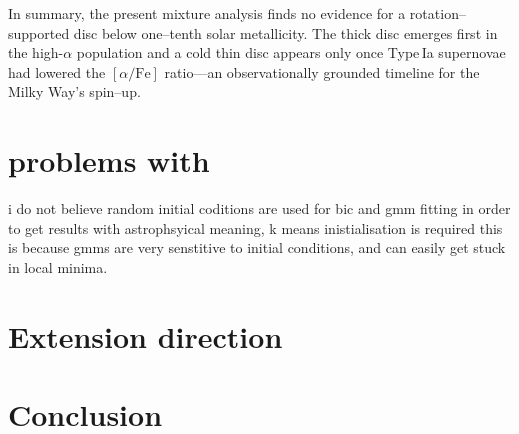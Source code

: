 \documentclass[a4paper,12pt]{article}
\begin{document}
\medskip
In summary, the present mixture analysis finds no evidence for a
rotation–supported disc below one–tenth solar metallicity.  The thick
disc emerges first in the high-$\alpha$ population and a cold thin
disc appears only once Type\,Ia supernovae had lowered the
$[\alpha/\mathrm{Fe}]$ ratio—an observationally grounded timeline for
the Milky Way’s spin–up.







\section{problems with \citet{zhang2024existencemetalpoordiscmilky}}

i do not believe random initial coditions are used for bic and gmm fitting
in order to get results with astrophsyical meaning, k means inistialisation is required
this is because gmms are very senstitive to initial conditions, and can easily get stuck in local minima.

\section{Extension direction}

\section{Conclusion}



\newpage


\end{document}
